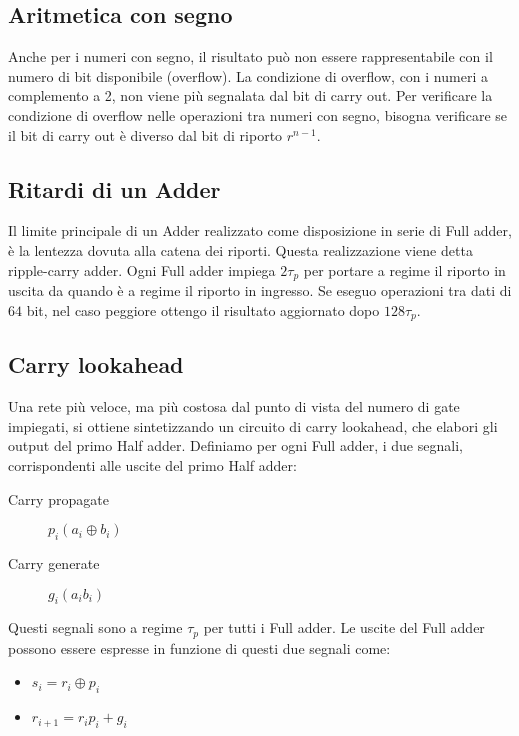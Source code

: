 \documentclass{article}
\begin{document}
\subsection{Aritmetica con segno}

Anche per i numeri con segno, il risultato può non essere rappresentabile con il numero di bit disponibile (overflow).
La condizione di overflow, con i numeri a complemento a 2, non viene più segnalata dal bit di carry out.
Per verificare la condizione di overflow nelle operazioni tra numeri con segno, bisogna verificare se il bit di carry out è diverso dal bit di riporto $r^{n-1}$.

\subsection{Ritardi di un Adder}

Il limite principale di un Adder realizzato come disposizione in serie di Full adder, è la lentezza dovuta alla catena dei riporti.
Questa realizzazione viene detta ripple-carry adder.
Ogni Full adder impiega $2 \tau_p$ per portare a regime il riporto in uscita da quando è a regime il riporto in ingresso.
Se eseguo operazioni tra dati di $64$ bit, nel caso peggiore ottengo il risultato aggiornato dopo $128 \tau_p$.

\subsection{Carry lookahead}

Una rete più veloce, ma più costosa dal punto di vista del numero di gate impiegati, si ottiene sintetizzando un circuito di carry lookahead, che elabori gli output del primo Half adder.
Definiamo per ogni Full adder, i due segnali, corrispondenti alle uscite del primo Half adder:

\begin{description}
    \item[Carry propagate] $p_i (a_i \oplus b_i)$
    \item[Carry generate] $g_i (a_i b_i)$
\end{description}

\noindent
Questi segnali sono a regime $\tau_p$ per tutti i Full adder.
Le uscite del Full adder possono essere espresse in funzione di questi due segnali come:

\begin{itemize}
    \item $s_i = r_i \oplus p_i$
    \item $r_{i+1} = r_i p_i + g_i$
\end{itemize}
\end{document}
